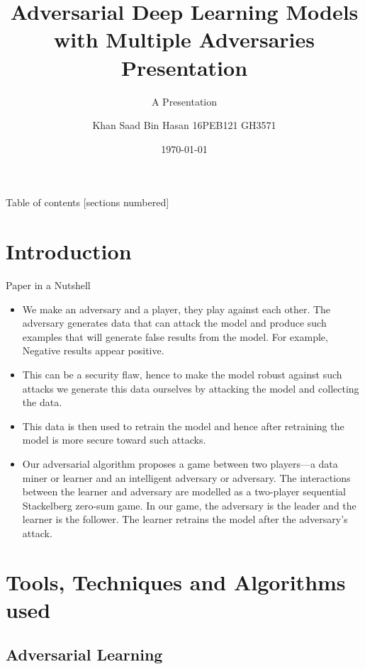\documentclass[10pt]{beamer}
\title{Adversarial Deep Learning Models with Multiple Adversaries Presentation}
\subtitle{A Presentation}
\author{Khan Saad Bin Hasan \newline 16PEB121 \newline GH3571}
\institute{Zakir Husain College Of Engineering and Technology \newline Aligarh Muslim University, Aligarh}
\date{\today}
\begin{document}
\maketitle

\begin{frame}{Table of contents}
  [sections numbered]
  \tableofcontents%
\end{frame}

\section[Introduction]{Introduction}

\begin{frame}[fragile]{Paper in a Nutshell}
    \begin{itemize}
    		\item We make an adversary and a player, they play against each other. The adversary generates data that can attack the model and produce such examples that will generate false results from the model. For example, Negative results appear positive. 
    		\item This can be a security flaw, hence to make the model robust against such attacks we generate this data ourselves by attacking the model and collecting the data.
    		\item This data is then used to retrain the model and hence after retraining the model is more secure toward such attacks.
    		\item Our adversarial algorithm proposes a game between two players—a data miner or learner and an intelligent adversary or adversary. The interactions between the learner and adversary are modelled as a two-player sequential Stackelberg zero-sum game. In our game, the adversary is the leader and the learner is the follower. The learner retrains the model after the adversary’s attack. 
    \end{itemize}
\end{frame}

\section[Tools, Techniques and Algorithms used]{Tools, Techniques and Algorithms used}

\subsection{Adversarial Learning}
\end{document}
